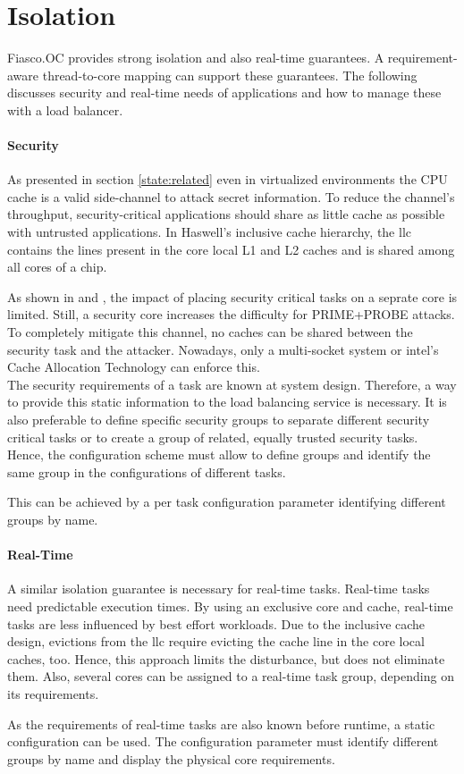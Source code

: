 \section{Isolation}
\label{design:isolation}

Fiasco.OC provides strong isolation and also real-time guarantees.
A requirement-aware thread-to-core mapping can support these guarantees.
The following discusses security and real-time needs of applications and how to
manage these with a load balancer.

\paragraph{Security}
As presented in section \ref{state:related} even in virtualized environments
the CPU cache is a valid side-channel to attack secret information.
To reduce the channel's throughput, security-critical applications should share
as little cache as possible with untrusted applications.
In Haswell's inclusive cache hierarchy, the \gls{llc} contains the lines
present in the core local L1 and L2 caches and is shared among all cores of a
chip.

As shown in \cite{inci_seriously_2015} and \cite{liu_last-level_2015},
the impact of placing security critical tasks on a seprate core is limited.
Still, a security core increases the difficulty for PRIME+PROBE attacks.
To completely mitigate this channel, no caches can be shared between the
security task and the attacker.
Nowadays, only a multi-socket system or \gls{intel}'s Cache Allocation
Technology can enforce this.
\\

The security requirements of a task are known at system design.
Therefore, a way to provide this static information to the load balancing
service is necessary.
It is also preferable to define specific security groups to separate different
security critical tasks or to create a group of related, equally trusted
security tasks.
Hence, the configuration scheme must allow to define groups and identify the
same group in the configurations of different tasks.

This can be achieved by a per task configuration parameter identifying
different groups by name.


\paragraph{Real-Time}
A similar isolation guarantee is necessary for real-time tasks.
Real-time tasks need predictable execution times.
By using an exclusive core and cache, real-time tasks are less influenced by
best effort workloads.
Due to the inclusive cache design, evictions from the \gls{llc} require
evicting the cache line in the core local caches, too.
Hence, this approach limits the disturbance, but does not eliminate them.
Also, several cores can be assigned to a real-time task group, depending on its
requirements.

As the requirements of real-time tasks are also known before runtime, a static
configuration can be used.
The configuration parameter must identify different groups by name
and display the physical core requirements.
